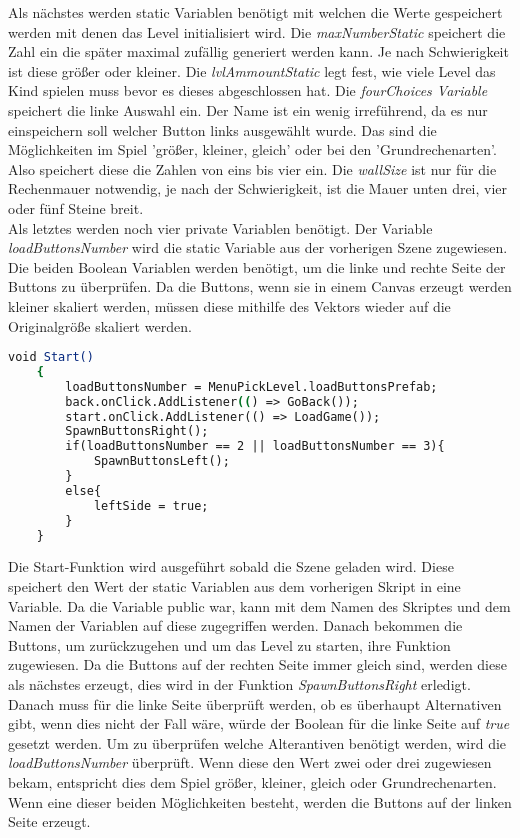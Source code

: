 Als nächstes werden static Variablen benötigt mit welchen die Werte gespeichert werden mit denen das Level initialisiert wird. Die \textit{maxNumberStatic} speichert die Zahl ein die später maximal zufällig generiert werden kann. Je nach Schwierigkeit ist diese größer oder kleiner. Die \textit{lvlAmmountStatic} legt fest, wie viele Level das Kind spielen muss bevor es dieses abgeschlossen hat. Die \textit{fourChoices Variable} speichert die linke Auswahl ein. Der Name ist ein wenig irreführend, da es nur einspeichern soll welcher Button links ausgewählt wurde. Das sind die Möglichkeiten im Spiel 'größer, kleiner, gleich' oder bei den 'Grundrechenarten'. Also speichert diese die Zahlen von eins bis vier ein. Die \textit{wallSize} ist nur für die Rechenmauer notwendig, je nach der Schwierigkeit, ist die Mauer unten drei, vier oder fünf Steine breit.\\
Als letztes werden noch vier private Variablen benötigt. Der Variable \textit{loadButtonsNumber} wird die static Variable aus der vorherigen Szene zugewiesen. Die beiden Boolean Variablen werden benötigt, um die linke und rechte Seite der Buttons zu überprüfen. Da die Buttons, wenn sie in einem Canvas erzeugt werden kleiner skaliert werden, müssen diese mithilfe des Vektors wieder auf die Originalgröße skaliert werden.\\
\begin{lstlisting}[language=csh, caption={MenuPickLevelAdvanced.cs Start-Funktion}]
	void Start()
	{
		loadButtonsNumber = MenuPickLevel.loadButtonsPrefab;
		back.onClick.AddListener(() => GoBack());
		start.onClick.AddListener(() => LoadGame());
		SpawnButtonsRight();
		if(loadButtonsNumber == 2 || loadButtonsNumber == 3){
			SpawnButtonsLeft();
		}
		else{
			leftSide = true;
		}
	}
\end{lstlisting}
Die Start-Funktion wird ausgeführt sobald die Szene geladen wird. Diese speichert den Wert der static Variablen aus dem vorherigen Skript in eine Variable. Da die Variable public war, kann mit dem Namen des Skriptes und dem Namen der Variablen auf diese zugegriffen werden.
Danach bekommen die Buttons, um zurückzugehen und um das Level zu starten, ihre Funktion zugewiesen. Da die Buttons auf der rechten Seite immer gleich sind, werden diese als nächstes erzeugt, dies wird in der Funktion \textit{SpawnButtonsRight} erledigt. Danach muss für die linke Seite überprüft werden, ob es überhaupt Alternativen gibt, wenn dies nicht der Fall wäre, würde der Boolean für die linke Seite auf \textit{true} gesetzt werden. Um zu überprüfen welche Alterantiven benötigt werden, wird die \textit{loadButtonsNumber} überprüft. Wenn diese den Wert zwei oder drei zugewiesen bekam, entspricht dies dem Spiel  größer, kleiner, gleich oder Grundrechenarten. Wenn eine dieser beiden Möglichkeiten besteht, werden die Buttons auf der linken Seite erzeugt.\\
